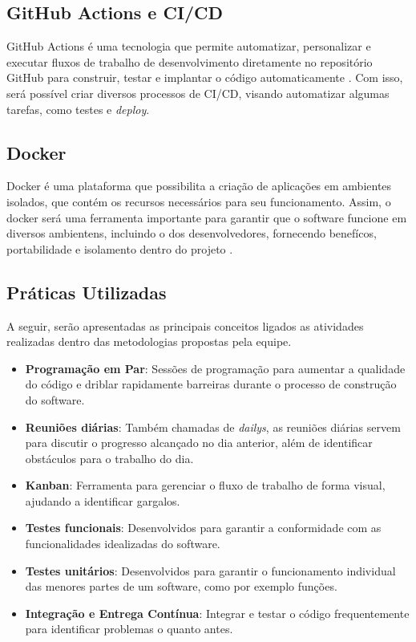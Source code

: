 \subsection{GitHub Actions e CI/CD}
GitHub Actions é uma tecnologia que permite automatizar, personalizar e executar fluxos de trabalho de desenvolvimento diretamente no repositório GitHub para construir, testar e implantar o código automaticamente \cite{githubactions}. Com isso, será possível criar diversos processos de CI/CD, visando automatizar algumas tarefas, como testes e \textit{deploy}.

\subsection{Docker}
Docker é uma plataforma que possibilita a criação de aplicações em ambientes isolados, que contém os recursos necessários para seu funcionamento. Assim, o docker será uma ferramenta importante para garantir que o software funcione em diversos ambientens, incluindo o dos desenvolvedores, fornecendo benefícos, portabilidade e isolamento dentro do projeto \cite{dockerdocs}.

\subsection{Práticas Utilizadas}
A seguir, serão apresentadas as principais conceitos ligados as atividades realizadas dentro das metodologias propostas pela equipe.

\begin{itemize}
    \item \textbf{Programação em Par}: Sessões de programação para aumentar a qualidade do código e driblar rapidamente barreiras durante o processo de construção do software.
    \item \textbf{Reuniões diárias}: Também chamadas de \textit{dailys}, as reuniões diárias servem para discutir o progresso alcançado no dia anterior, além de identificar obstáculos para o trabalho do dia.
    \item \textbf{Kanban}: Ferramenta para gerenciar o fluxo de trabalho de forma visual, ajudando a identificar gargalos.
    \item \textbf{Testes funcionais}: Desenvolvidos para garantir a conformidade com as funcionalidades idealizadas do software.
    \item \textbf{Testes unitários}: Desenvolvidos para garantir o funcionamento individual das menores partes de um software, como por exemplo funções.
    \item \textbf{Integração e Entrega Contínua}: Integrar e testar o código frequentemente para identificar problemas o quanto antes.
\end{itemize}

